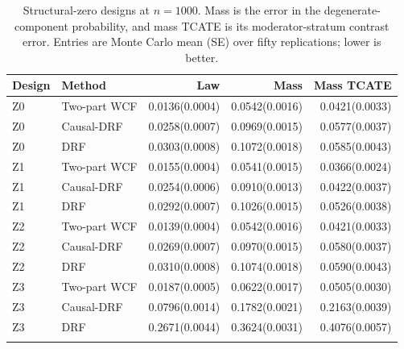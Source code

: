 \begin{table}[t]
\centering
\scriptsize
\caption{Structural-zero designs at $n=1000$. Mass is the error in the degenerate-component probability, and mass TCATE is its moderator-stratum contrast error. Entries are Monte Carlo mean (SE) over fifty replications; lower is better.}
\label{tab:full_results_z}
\begin{tabular}{llrrr}
\toprule
Design & Method & Law & Mass & Mass TCATE \\
\midrule
Z0 & Two-part WCF & 0.0136(0.0004) & 0.0542(0.0016) & 0.0421(0.0033) \\
Z0 & Causal-DRF & 0.0258(0.0007) & 0.0969(0.0015) & 0.0577(0.0037) \\
Z0 & DRF & 0.0303(0.0008) & 0.1072(0.0018) & 0.0585(0.0043) \\
\addlinespace
Z1 & Two-part WCF & 0.0155(0.0004) & 0.0541(0.0015) & 0.0366(0.0024) \\
Z1 & Causal-DRF & 0.0254(0.0006) & 0.0910(0.0013) & 0.0422(0.0037) \\
Z1 & DRF & 0.0292(0.0007) & 0.1026(0.0015) & 0.0526(0.0038) \\
\addlinespace
Z2 & Two-part WCF & 0.0139(0.0004) & 0.0542(0.0016) & 0.0421(0.0033) \\
Z2 & Causal-DRF & 0.0269(0.0007) & 0.0970(0.0015) & 0.0580(0.0037) \\
Z2 & DRF & 0.0310(0.0008) & 0.1074(0.0018) & 0.0590(0.0043) \\
\addlinespace
Z3 & Two-part WCF & 0.0187(0.0005) & 0.0622(0.0017) & 0.0505(0.0030) \\
Z3 & Causal-DRF & 0.0796(0.0014) & 0.1782(0.0021) & 0.2163(0.0039) \\
Z3 & DRF & 0.2671(0.0044) & 0.3624(0.0031) & 0.4076(0.0057) \\
\addlinespace
\bottomrule
\end{tabular}
\end{table}

